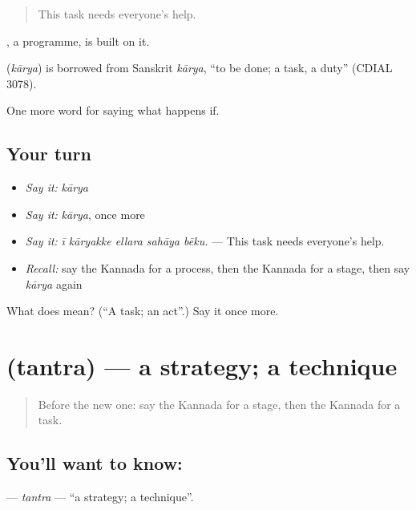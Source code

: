\begin{quote}
This task needs everyone's help.
\end{quote}

, a programme, is built on it.

\begin{cousinweb}
\textbf{} (\emph{kārya}) is borrowed from Sanskrit \emph{kārya}, \textquotedblleft{}to be done; a task, a duty\textquotedblright{} (CDIAL 3078).
\end{cousinweb}

\begin{grammarlens}[title={What you've built}]
One more word for saying what happens if.
\end{grammarlens}

\subsection*{Your turn}
\begin{itemize}
\raggedright
  \item \emph{Say it:} \emph{kārya}
  \item \emph{Say it:} \emph{kārya}, once more
  \item \emph{Say it:} \emph{ī kāryakke ellara sahāya bēku.} — This task needs everyone's help.
  \item \emph{Recall:} say the Kannada for a process, then the Kannada for a stage, then say \emph{kārya} again
\end{itemize}

\begin{tcolorbox}[breakable,colback=teal!4,colframe=teal!35!black,title={Before you move on}]
What does  mean? (\textquotedblleft{}A task; an act\textquotedblright{}.) Say it once more.
\end{tcolorbox}
\section[\texorpdfstring{\kn{ತಂತ್ರ} (tantra)}{ತಂತ್ರ (tantra)}]{ (tantra) — a strategy; a technique}

\label{lesson:KA-C423-tantra}



\begin{quote}
Before the new one: say the Kannada for a stage, then the Kannada for a task.
\end{quote}

\subsection*{You'll want to know: }
\textbf{} — \emph{tantra} — \textquotedblleft{}a strategy; a technique\textquotedblright{}.

